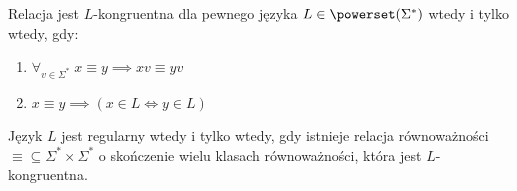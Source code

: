 \begin{definition}
    Relacja jest \(L\)-kongruentna dla pewnego języka \(L \in \powerset(\Sigma^*)\) wtedy i tylko wtedy, gdy:
    \begin{enumerate}
        \item \(\forall_{v \in \Sigma^*}\; x \equiv y \implies xv \equiv yv \)
        \item \( x \equiv y \implies (x \in L \iff y \in L)\)
    \end{enumerate}
\end{definition}


\begin{theorem}
    Język \( L \) jest regularny wtedy i tylko wtedy, gdy istnieje relacja równoważności \( \equiv \subseteq \Sigma^* \times \Sigma^*\) o skończenie wielu klasach równoważności, która jest \(L\)-kongruentna.
\end{theorem}
